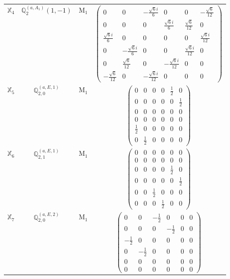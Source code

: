 \documentclass[fleqn,10pt,landscape]{article}
\begin{document}
\begin{itemize}
\begin{center}
\begin{longtable}{c|c|c|c}
$ \mathbb{X}_{4} $ & $\mathbb{Q}_{2}^{(a,A_{1})}(1,-1)$ & M$_{1}$ & $\begin{pmatrix} 0 & 0 & - \frac{\sqrt{6} i}{6} & 0 & 0 & - \frac{\sqrt{6}}{12} \\ 0 & 0 & 0 & \frac{\sqrt{6} i}{6} & \frac{\sqrt{6}}{12} & 0 \\ \frac{\sqrt{6} i}{6} & 0 & 0 & 0 & 0 & \frac{\sqrt{6} i}{12} \\ 0 & - \frac{\sqrt{6} i}{6} & 0 & 0 & \frac{\sqrt{6} i}{12} & 0 \\ 0 & \frac{\sqrt{6}}{12} & 0 & - \frac{\sqrt{6} i}{12} & 0 & 0 \\ - \frac{\sqrt{6}}{12} & 0 & - \frac{\sqrt{6} i}{12} & 0 & 0 & 0 \end{pmatrix}$ \\
$ \mathbb{X}_{5} $ & $\mathbb{Q}_{2,0}^{(a,E,1)}$ & M$_{1}$ & $\begin{pmatrix} 0 & 0 & 0 & 0 & \frac{1}{2} & 0 \\ 0 & 0 & 0 & 0 & 0 & \frac{1}{2} \\ 0 & 0 & 0 & 0 & 0 & 0 \\ 0 & 0 & 0 & 0 & 0 & 0 \\ \frac{1}{2} & 0 & 0 & 0 & 0 & 0 \\ 0 & \frac{1}{2} & 0 & 0 & 0 & 0 \end{pmatrix}$ \\
$ \mathbb{X}_{6} $ & $\mathbb{Q}_{2,1}^{(a,E,1)}$ & M$_{1}$ & $\begin{pmatrix} 0 & 0 & 0 & 0 & 0 & 0 \\ 0 & 0 & 0 & 0 & 0 & 0 \\ 0 & 0 & 0 & 0 & \frac{1}{2} & 0 \\ 0 & 0 & 0 & 0 & 0 & \frac{1}{2} \\ 0 & 0 & \frac{1}{2} & 0 & 0 & 0 \\ 0 & 0 & 0 & \frac{1}{2} & 0 & 0 \end{pmatrix}$ \\
$ \mathbb{X}_{7} $ & $\mathbb{Q}_{2,0}^{(a,E,2)}$ & M$_{1}$ & $\begin{pmatrix} 0 & 0 & - \frac{1}{2} & 0 & 0 & 0 \\ 0 & 0 & 0 & - \frac{1}{2} & 0 & 0 \\ - \frac{1}{2} & 0 & 0 & 0 & 0 & 0 \\ 0 & - \frac{1}{2} & 0 & 0 & 0 & 0 \\ 0 & 0 & 0 & 0 & 0 & 0 \\ 0 & 0 & 0 & 0 & 0 & 0 \end{pmatrix}$ \\

\end{longtable}
\end{center}
\end{itemize}
\end{document}
